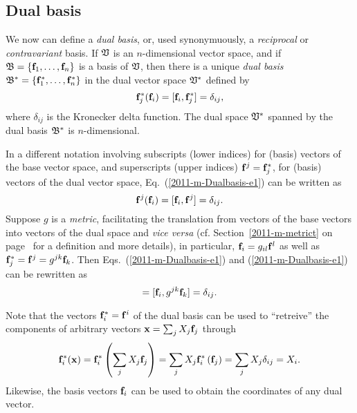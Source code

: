 \subsection{Dual basis}
\label{2011-m-Dualbasis}

We now can define a {\em dual basis}, or, used synonymuously, a {\em reciprocal} or {\em contravariant} basis.
If ${\frak V}$ is an $n$-dimensional vector space, and if
${\frak B} = \{{\bf f}_1,\ldots , {\bf f}_n\}$
is a basis of  ${\frak V}$,
then there is a unique {\em dual basis}
${\frak B}^\ast
=\{{\bf f}_1^\ast ,\ldots , {\bf f}_n^\ast \}$ in the dual vector space ${\frak V}^\ast $
defined by
\begin{equation}
{\bf f}_j^\ast ({\bf f}_i) =  [{\bf f}_i,  {\bf f}_j^\ast ]=\delta_{ij},
\label{2011-m-Dualbasis-e1}
\end{equation}
where  $\delta_{ij}$
is the Kronecker delta function.
The dual space  ${\frak V}^\ast $ spanned by the dual basis ${\frak B}^\ast $ is $n$-dimensional.

In a different notation involving subscripts (lower indices) for (basis) vectors of the base vector space,
and superscripts (upper indices) ${\bf f}^j = {\bf f}_j^\ast $,
for (basis) vectors of the dual vector space,
Eq.~(\ref{2011-m-Dualbasis-e1}) can be written as
\begin{equation}
{\bf f}^j ( {\bf f}_i ) = [{\bf f}_i,{\bf f}^j]=\delta_{ij}.
\label{2011-m-Dualbasis-e2}
\end{equation}
Suppose
$g$ is a {\em metric},
facilitating the translation from vectors of the base vectors into vectors of the dual space and {\it vice versa}
(cf. Section~\ref{2011-m-metrict} on page~\pageref{2011-m-metrict} for a definition and more details),
in particular, ${\bf f}_i =  g_{il}{\bf f}^l$
as well as  ${\bf f}_j^\ast  = {\bf f}^j = g^{jk}{\bf f}_k$.
Then Eqs.~(\ref{2011-m-Dualbasis-e1}) and (\ref{2011-m-Dualbasis-e1}) can be rewritten as
\begin{equation}
[g_{il} {\bf f}^l, {\bf f}^j]    = [{\bf f}_i, g^{jk} {\bf f}_k]  = \delta_{ij}.
\label{2011-m-Dualbasis-e3}
\end{equation}

Note that the vectors ${\bf f}^\ast_i = {\bf f}^i$ of the dual basis can be used to ``retreive'' the components of arbitrary vectors
${\bf x} = \sum_j X_j {\bf f}_j$  through
\begin{equation}
{\bf f}^\ast_i ( {\bf x} ) =
{\bf f}^\ast_i \left( \sum_j X_j {\bf f}_j \right) =
\sum_j  X_j {\bf f}^\ast_i \left({\bf f}_j \right) =
\sum_j  X_j \delta_{ij} =
X_i.
\label{2016-m-fdlvs-recoverc}
\end{equation}
Likewise, the basis vectors ${\bf f}_i$ can be used to obtain the coordinates of any dual vector.



